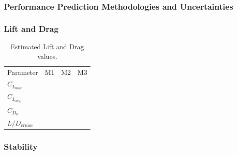 \documentclass[report]{byu-aero}
\begin{document}
\subsubsection{Performance Prediction Methodologies and Uncertainties}
\label{sssec:uncertaintyanalysis}




\subsubsection{Lift and Drag}
\label{sssec:liftdrag}

\begin{table}[h!]
	\centering
	\caption{Estimated Lift and Drag values.}
	\label{tab:estimatedLD}
	\begin{tabular}{ C{1in}  C{1in}  C{1in}  C{1in}}
		
		Parameter & M1 & M2 & M3 \\
		
		\(C_{L_\text{max}}\) & & &\\
		
		\(C_{L_\text{avg}}\) & & &\\
		
		\(C_{D_0}\) & & &\\
		
		\(L/D_\text{cruise}\) & & &\\
		
	\end{tabular}
\end{table}


\subsubsection{Stability}
\label{sssec:stability}
\end{document}
